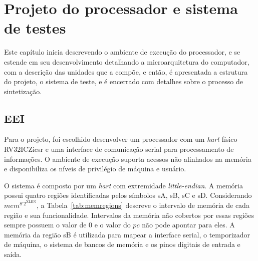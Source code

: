 
\chapter{Projeto do processador e sistema de testes}
\label{cap:3}

Este capítulo inicia descrevendo o ambiente de execução do processador, e 
se estende em seu desenvolvimento detalhando a microarquitetura do computador, 
com a descrição das unidades que a compõe, e então, é
apresentada a estrutura do projeto, o sistema de teste, e é encerrado com detalhes sobre
o processo de sintetização.

\section{EEI}
\label{sec:eei}

Para o projeto, foi escolhido desenvolver um processador com um \emph{hart} físico RV32ICZicsr e 
uma interface de comunicação serial para processamento de informações. O ambiente de execução
suporta acessos não alinhados na memória e disponibiliza os níveis de privilégio de máquina e
usuário.

O sistema é composto por um \emph{hart} com extremidade \emph{little-endian}. A memória possui quatro
regiões identificadas pelos símbolos sA, sB, sC e sD. Considerando $mem^{8'2^\text{XLEN}}$, a Tabela~\ref{tab:memregions} 
descreve o intervalo
de memória de cada região e sua funcionalidade. Intervalos da memória não cobertos por essas regiões
sempre possuem o valor de 0 e o valor do $pc$ não pode apontar para eles.
A memória da região sB é utilizada para mapear a interface serial, o temporizador de máquina, o sistema de bancos de memória e os pinos digitais
de entrada e saída.

